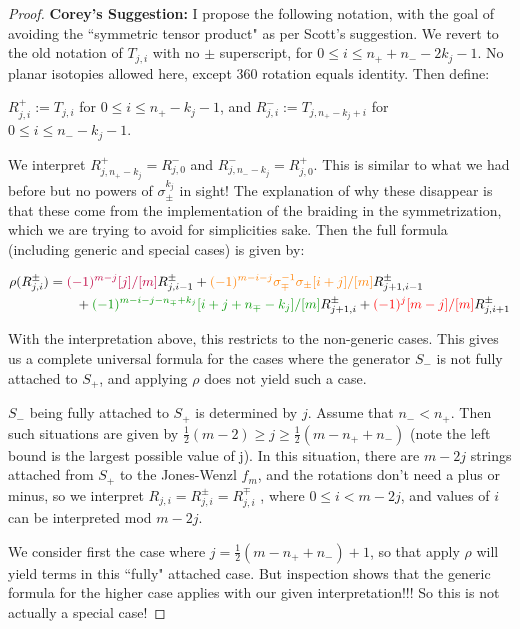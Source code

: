 \documentclass[12pt]{article}
\begin{document}
\begin{proof}

\bigskip

\textbf{Corey's Suggestion:}  I propose the following notation, with the goal of avoiding the ``symmetric tensor product" as per Scott's suggestion.  We revert to the old notation of $T_{j,i}$ with no $\pm$ superscript, for $0\le i\le n_{+}+n_{-}-2k_{j}-1$.  No planar isotopies allowed here, except 360 rotation equals identity.  Then define:

\medskip

$R^{+}_{j,i}:=T_{j,i}$ for $0\le i\le n_{+}-k_{j}-1$, and $R^{-}_{j,i}:=T_{j,n_{+}-k_{j}+i}$ for $0\le i\le n_{-}-k_{j}-1$.

We interpret $R^{+}_{j,n_{+}-k_{j}}=R^{-}_{j,0}$ and $R^{-}_{j,n_{-}-k_{j}}=R^{+}_{j,0}$.  This is similar to what we had before but no powers of $\sigma_{\pm}^{k_j}$ in sight!  The explanation of why these disappear is that these come from the implementation of the braiding in the symmetrization, which we are trying to avoid for simplicities sake.  Then the full formula (including generic and special cases) is given by:
 
 \begin{align*}
\rho(R^\pm_{j,i}) 
&= 
\textcolor{purple}{(-1)^{m-j}[j]/[m]} R^\pm_{j,i-1}
+\textcolor{orange}{(-1)^{m-i-j} \sigma^{-1}_\mp\sigma_\pm [i+j]/[m] } R^\pm_{j+1,i-1}
\\ &\qquad
+\textcolor{DarkGreen}{(-1)^{m-i-j-n_{\mp}+k_j}[i+j+n_{\mp}-k_j]/[m]} R^\pm_{j+1,i}
+\textcolor{red}{(-1)^j [m-j]/[m]} R^\pm_{j,i+1}
\end{align*}
 
With the interpretation above, this restricts to the non-generic cases.  This gives us a complete universal formula for the cases where the generator $S_{-}$ is not fully attached to $S_{+}$, and applying $\rho$ does not yield such a case.

$S_{-}$ being fully attached to $S_{+}$ is determined by $j$.  Assume that $n_{-}<n_{+} $. Then such situations are given by $\frac{1}{2}(m-2)\ge j\ge \frac{1}{2}(m-n_{+}+n_{-})$ (note the left bound is the largest possible value of j).  In this situation, there are $m-2j$ strings attached from $S_{+}$ to the Jones-Wenzl $f_{m}$, and the rotations don't need a plus or minus, so we interpret $R_{j,i}=R^{\pm}_{j,i}=R^{\mp}_{j,i}$ , where $0\le i <m-{2j}$, and values of $i$ can be interpreted mod $m-2j$. 

We consider first the case where $j=\frac{1}{2}(m-n_{+}+n_{-})+1$, so that apply $\rho$ will yield terms in this ``fully" attached case.  But inspection shows that the generic formula for the higher case applies with our given interpretation!!! So this is not actually a special case!




\end{proof}
\end{document}

